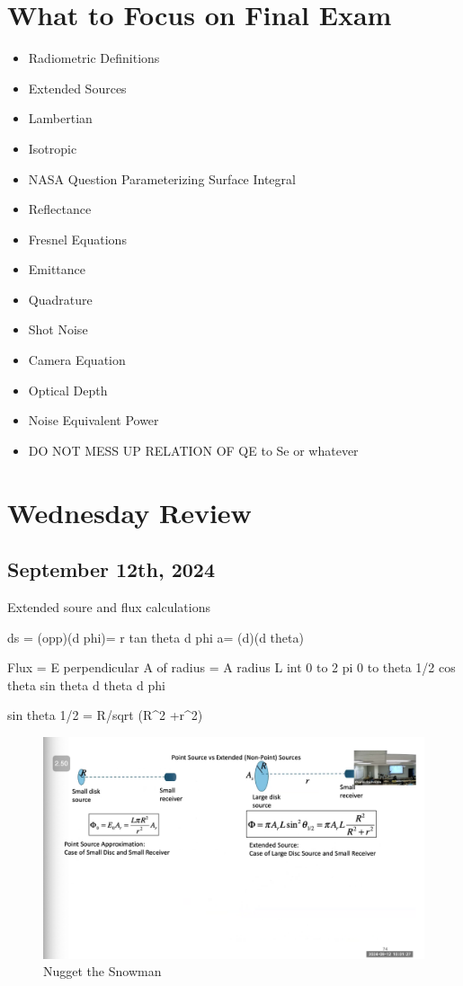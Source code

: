 \documentclass{article}
\begin{document}
\section{What to Focus on Final Exam}
\begin{itemize}
    \item Radiometric Definitions
    \item Extended Sources
    \item Lambertian 
    \item Isotropic 
    \item NASA Question Parameterizing Surface Integral
    \item Reflectance
    \item Fresnel Equations 
    \item Emittance 
    \item Quadrature
    \item Shot Noise 
    \item Camera Equation 
    \item Optical Depth 
    \item Noise Equivalent Power 
    \item DO NOT MESS UP RELATION OF QE to Se or whatever
    
\end{itemize}

\section{Wednesday Review}


\subsection{September 12th, 2024}

Extended soure and flux calculations

ds = (opp)(d phi)= r tan theta d phi 
a= (d)(d theta)

Flux = E perpendicular A of radius = A radius L int 0 to 2 pi 0 to theta 1/2 cos theta sin theta d theta d phi 

sin theta 1/2 = R/sqrt (R^2 +r^2)

\begin{figure}[h!]
\centering
\includegraphics[scale=.6]{Radiometry/Week3/Notes/sept12th.png}
\caption{Nugget the Snowman}
\label{fig:Sept 12}
\end{figure}
\end{document}
